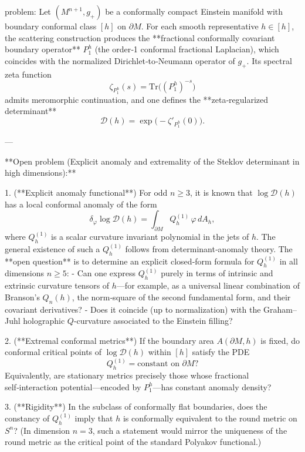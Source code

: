 problem:  
Let \((M^{n+1},g_+)\) be a conformally compact Einstein manifold with boundary conformal class \([\!h\!]\) on \(\partial M\).  
For each smooth representative \(h\in[\!h\!]\), the scattering construction produces the **fractional conformally covariant boundary operator** \(P^h_1\) (the order‑1 conformal fractional Laplacian), which coincides with the normalized Dirichlet‑to‑Neumann operator of \(g_+\).  
Its spectral zeta function
\[
\zeta_{P^h_1}(s) = \mathrm{Tr}\big((P^h_1)^{-s}\big)
\]
admits meromorphic continuation, and one defines the **zeta‑regularized determinant**
\[
\mathcal D(h) = \exp\!\big(-\zeta'_{P^h_1}(0)\big).
\]

---

**Open problem (Explicit anomaly and extremality of the Steklov determinant in high dimensions):**

1. (**Explicit anomaly functional**)  
   For odd \(n\ge3\), it is known that \(\log \mathcal D(h)\) has a local conformal anomaly of the form  
   \[
   \delta_\varphi \log \mathcal D(h)
      = \int_{\partial M} Q^{(1)}_h\, \varphi\, dA_h,
   \]
   where \(Q^{(1)}_h\) is a scalar curvature invariant polynomial in the jets of \(h\).  
   The general existence of such a \(Q^{(1)}_h\) follows from determinant‑anomaly theory.  
   The **open question** is to determine an explicit closed‑form formula for \(Q^{(1)}_h\) in all dimensions \(n\ge5\):
   - Can one express \(Q^{(1)}_h\) purely in terms of intrinsic and extrinsic curvature tensors of \(h\)—for example, as a universal linear combination of Branson's \(Q_n(h)\), the norm‑square of the second fundamental form, and their covariant derivatives?  
   - Does it coincide (up to normalization) with the Graham–Juhl holographic \(Q\)-curvature associated to the Einstein filling?

2. (**Extremal conformal metrics**)  
   If the boundary area \(A(\partial M,h)\) is fixed, do conformal critical points of \(\log \mathcal D(h)\) within \([\!h\!]\) satisfy the PDE
   \[
   Q^{(1)}_h = \text{constant on }\partial M?
   \]
   Equivalently, are stationary metrics precisely those whose fractional self‑interaction potential—encoded by \(P^h_1\)—has constant anomaly density?

3. (**Rigidity**)  
   In the subclass of conformally flat boundaries, does the constancy of \(Q^{(1)}_h\) imply that \(h\) is conformally equivalent to the round metric on \(S^n\)?  
   (In dimension \(n=3\), such a statement would mirror the uniqueness of the round metric as the critical point of the standard Polyakov functional.)

